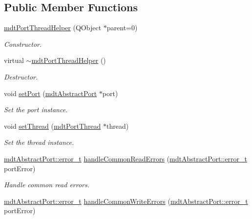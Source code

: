 \subsection*{Public Member Functions}
\begin{DoxyCompactItemize}
\item 
\hypertarget{classmdt_port_thread_helper_a6e3b234e868b9918a26866ffeee4c0ca}{
\hyperlink{classmdt_port_thread_helper_a6e3b234e868b9918a26866ffeee4c0ca}{mdtPortThreadHelper} (QObject $\ast$parent=0)}
\label{classmdt_port_thread_helper_a6e3b234e868b9918a26866ffeee4c0ca}

\begin{DoxyCompactList}\small\item\em Constructor. \end{DoxyCompactList}\item 
virtual \hyperlink{classmdt_port_thread_helper_a5d086b22714a73fe2286f096b4cddaf9}{$\sim$mdtPortThreadHelper} ()
\begin{DoxyCompactList}\small\item\em Destructor. \end{DoxyCompactList}\item 
void \hyperlink{classmdt_port_thread_helper_a4127c0b28dc63df06b5a36a4be8b3bb7}{setPort} (\hyperlink{classmdt_abstract_port}{mdtAbstractPort} $\ast$port)
\begin{DoxyCompactList}\small\item\em Set the port instance. \end{DoxyCompactList}\item 
void \hyperlink{classmdt_port_thread_helper_af6c9d2cb2e9e922942236068bf634b0b}{setThread} (\hyperlink{classmdt_port_thread}{mdtPortThread} $\ast$thread)
\begin{DoxyCompactList}\small\item\em Set the thread instance. \end{DoxyCompactList}\item 
\hyperlink{classmdt_abstract_port_ad4121bb930c95887e77f8bafa065a85e}{mdtAbstractPort::error\_\-t} \hyperlink{classmdt_port_thread_helper_a53d0eacc7048cf32566785a7fb527458}{handleCommonReadErrors} (\hyperlink{classmdt_abstract_port_ad4121bb930c95887e77f8bafa065a85e}{mdtAbstractPort::error\_\-t} portError)
\begin{DoxyCompactList}\small\item\em Handle common read errors. \end{DoxyCompactList}\item 
\hyperlink{classmdt_abstract_port_ad4121bb930c95887e77f8bafa065a85e}{mdtAbstractPort::error\_\-t} \hyperlink{classmdt_port_thread_helper_a84871009b6128912f7d3869b14e37aa2}{handleCommonWriteErrors} (\hyperlink{classmdt_abstract_port_ad4121bb930c95887e77f8bafa065a85e}{mdtAbstractPort::error\_\-t} portError)

\end{DoxyCompactItemize}
